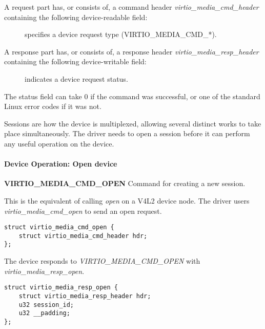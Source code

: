 A request part has, or consists of, a command header \textit{virtio_media_cmd_header}
containing the following device-readable field:

\begin{description}
\item[] specifies a device request type (VIRTIO_MEDIA_CMD_*).
\end{description}

A response part has, or consists of, a response header \textit{virtio_media_resp_header}
containing the following device-writable field:

\begin{description}
\item[] indicates a device request status.
\end{description}

The status field can take 0 if the command was successful, or one of the
standard Linux error codes if it was not.


Sessions are how the device is multiplexed, allowing several distinct works to
take place simultaneously. The driver needs to open a session before it can
perform any useful operation on the device.

\paragraph{Device Operation: Open device}

\textbf{VIRTIO_MEDIA_CMD_OPEN} Command for creating a new session.

This is the equivalent of calling \textit{open} on a V4L2 device node.
The driver users \textit{virtio_media_cmd_open} to send an open request.

\begin{lstlisting}
struct virtio_media_cmd_open {
    struct virtio_media_cmd_header hdr;
};
\end{lstlisting}

The device responds to \textit{VIRTIO_MEDIA_CMD_OPEN} with \textit{virtio_media_resp_open}.

\begin{lstlisting}
struct virtio_media_resp_open {
    struct virtio_media_resp_header hdr;
    u32 session_id;
    u32 __padding;
};
\end{lstlisting}

